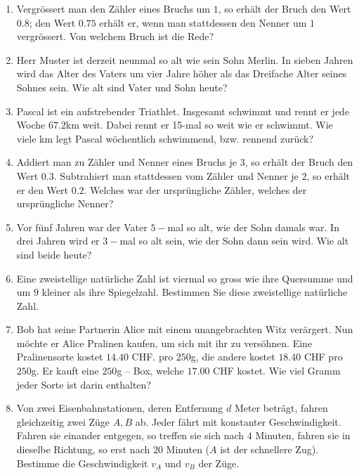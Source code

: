 \documentclass[11pt,oneside]{article}
\begin{document}
	\begin{aufgabe}
		\begin{enumerate}[label=\alph*)]
			\item Vergrössert man den Zähler eines Bruchs um $1$, so erhält der Bruch den Wert $0.8$; den Wert $0.75$ erhält er, wenn man stattdessen den Nenner um $1$ vergrössert. Von welchem Bruch ist die Rede?
			\item Herr Muster ist derzeit neunmal so alt wie sein Sohn Merlin. In sieben Jahren wird das Alter des Vaters um vier Jahre höher als das Dreifache Alter seines Sohnes sein. Wie alt sind Vater und Sohn heute?
			\item Pascal ist ein aufstrebender Triathlet. Insgesamt schwimmt und rennt er jede Woche $67.2$km weit. Dabei rennt er 15-mal so weit wie er schwimmt. Wie viele km legt Pascal wöchentlich schwimmend, bzw. rennend zurück?
			\item Addiert man zu Zähler und Nenner eines Bruchs je $3$, so erhält der Bruch den Wert $0.3$. Subtrahiert man stattdessen vom Zähler und Nenner je $2$, so erhält er den Wert $0.2$. Welches war der ursprüngliche Zähler, welches der ursprüngliche Nenner?
			\item Vor fünf Jahren war der Vater $5-$mal so alt, wie der Sohn damals war. In drei Jahren wird er $3-$mal so alt sein, wie der Sohn dann sein wird. Wie alt sind beide heute?
			\item Eine zweistellige natürliche Zahl ist viermal so gross wie ihre Quersumme und um $9$ kleiner als ihre Spiegelzahl. Bestimmen Sie diese zweistellige natürliche Zahl.
			\item Bob hat seine Partnerin Alice mit einem unangebrachten Witz verärgert. Nun möchte er Alice Pralinen kaufen, um sich mit ihr zu versöhnen. Eine Pralinensorte kostet $14.40$ CHF. pro $250$g, die andere kostet $18.40$ CHF pro $250$g. Er kauft eine $250$g – Box, welche $17.00$ CHF
			kostet. Wie viel Gramm jeder Sorte ist darin enthalten?
			\item Von zwei Eisenbahnstationen, deren Entfernung $d$ Meter beträgt, fahren gleichzeitig zwei Züge $A,B$ ab. Jeder fährt mit konstanter Geschwindigkeit. Fahren sie einander entgegen, so treffen sie sich nach $4$ Minuten, fahren sie in dieselbe Richtung, so erst nach $20$ Minuten ($A$ ist der schnellere Zug). Bestimme die Geschwindigkeit $v_A$ und $v_B$ der Züge.
		\end{enumerate}
	\end{aufgabe}
	\newpage
\end{document}
